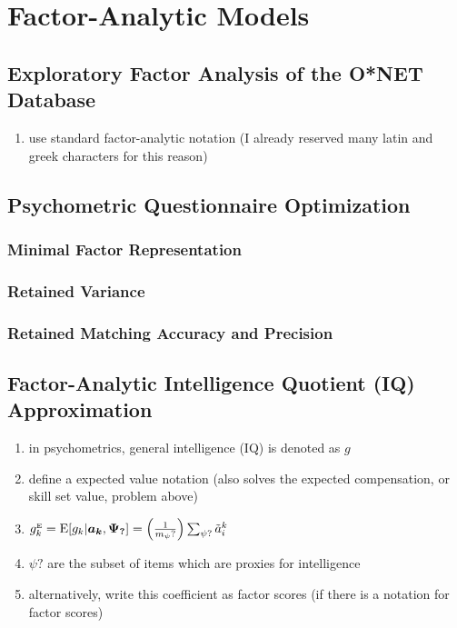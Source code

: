 \documentclass{elsarticle} %
\begin{document}


\section{Factor-Analytic Models}
\subsection{Exploratory Factor Analysis of the O*NET Database}
\begin{enumerate}
    \item use standard factor-analytic notation (I already reserved many latin and greek
          characters for this reason)
\end{enumerate}

\subsection{Psychometric Questionnaire Optimization}
\subsubsection{Minimal Factor Representation}
\subsubsection{Retained Variance}
\subsubsection{Retained Matching Accuracy and Precision}

\subsection{Factor-Analytic Intelligence Quotient (IQ) Approximation}
\begin{enumerate}
    \item in psychometrics, general intelligence (IQ) is denoted as $g$
    \item define a expected value notation (also solves the expected compensation, or
          skill set value, problem above)
    \item $g_{k}^{\text{\tiny{E}}} = \text{E}[g_k | \boldsymbol{a_k}, \boldsymbol{\Psi_?}] =
              \left(
              \frac{1}{m_\psi?}
              \right)
              \sum_{\psi?}{
                  \tilde{a}_{i}^{k}
              }
          $
    \item $\psi?$ are the subset of items which are proxies for intelligence
    \item alternatively, write this coefficient as factor scores (if there is a notation
          for factor scores)
\end{enumerate}
\end{document}
